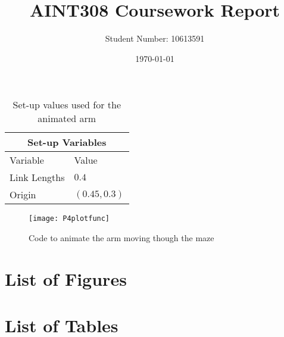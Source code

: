 \documentclass{article}
\begin{document}
\title{AINT308 Coursework Report}
\author{Student Number: 10613591}
\date{\today}
\maketitle

\newpage

\tableofcontents

\newpage

\begin{abstract}

\end{abstract}

\begin{table}[h!]
\centering
\begin{tabular}{ |p{3cm}||p{3cm}| }
 \hline
 \multicolumn{2}{|c|}{Set-up Variables} \\
 \hline
 Variable& Value\\
 \hline
 Link Lengths & $0.4$\\
 Origin & $(0.45,0.3)$\\
 \hline
\end{tabular}
\caption{Set-up values used for the animated arm}
\end{table}


\begin{figure}[H]
	\begin{adjustbox}{center,max width=1.1\textwidth}
	\texttt{[image: P4plotfunc]}
	\end{adjustbox}
	\caption{ Code to animate the arm moving though the maze}
	\label{fig:p4plotfunc}
\end{figure}

\newpage
{}
\printbibliography
\appendix

\section{List of Figures}
\listoffigures
\section{List of Tables}
\listoftables
\end{document}

